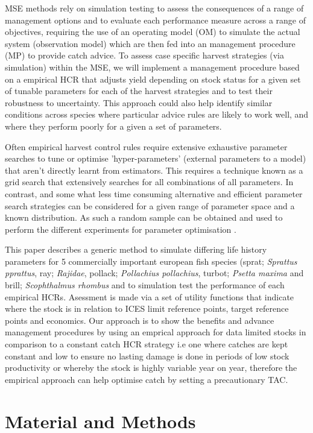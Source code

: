 \documentclass[preprint,review,12pt]{elsarticle}
\begin{document}
MSE methods rely on simulation testing to assess the consequences of a range of management options and to evaluate each performance measure across a range of objectives, requiring the use of an operating model (OM) to simulate the actual system (observation model) which are then fed into an management procedure (MP) to provide catch advice. To assess case specific harvest strategies (via simulation) within the MSE, we will implement a management procedure based on a empirical HCR that adjusts yield depending on stock status for a given set of tunable parameters for each of the harvest strategies and to test their robustness to uncertainty.  This approach could also help identify similar conditions across species where particular advice rules are likely to work well, and where they perform poorly for a given a set of parameters. 

Often empirical harvest control rules require extensive exhaustive parameter searches to tune or optimise 'hyper-parameters' (external parameters to a model) that aren’t directly learnt from estimators.  This requires a technique known as a grid search that extensively searches for all combinations of all parameters. In contrast, and some what less time consuming alternative and efficient parameter search strategies can be considered for a given range of parameter space and a known distribution.  As such a random sample can be obtained and used to perform the different experiments for parameter optimisation \cite{bergstra2012random}. 

This paper describes a generic method to simulate differing life history parameters for 5 commercially important european fish species  (sprat; \emph{Sprattus pprattus}, ray; \emph{Rajidae}, pollack; \emph{Pollachius pollachius}, turbot; \emph{Psetta maxima} and brill; \emph{Scophthalmus rhombus} and to simulation test the performance of each empirical HCRs.  Asessment is made via a set of utility functions that indicate where the stock is in relation to ICES limit reference points, target reference points and economics. Our approach is to show the benefits and advance management procedures by using an emprical approach for data limited stocks in comparison to a constant catch HCR strategy i.e one where catches are kept constant and low to ensure no lasting damage is done in periods of low stock productivity or whereby the stock is highly variable year on year, therefore the empirical approach can help optimise catch by setting a precautionary TAC. 


\section{Material and Methods}
\end{document}
